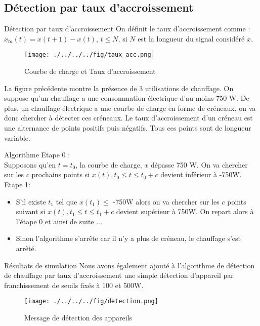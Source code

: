 \documentclass{beamer}
\begin{document}
\subsection{Détection par taux d'accroissement}

\begin{frame}{Détection par taux d'accroissement}
On définit le taux d'accroissement comme : $x_{ta}(t) = x(t+1) - x(t)$, $t \le N$, si $N$ est la longueur du signal considéré $x$.
\begin{figure}[!h]
\begin{center}
\texttt{[image: ./../../../fig/taux\_acc.png]}
\caption{Courbe de charge et Taux d'accroissement}
\label{Figure1}
\end{center}
\end{figure}
\end{frame}

\begin{frame}
La figure précédente montre la présence de 3 utilisations de chauffage. On suppose qu'un chauffage a une consommation électrique d'au moins 750 W. De plus, un chauffage électrique a une courbe de charge en forme de créneaux, on va donc chercher à détecter ces créneaux. Le taux d'accroissement d'un créneau est une alternance de points positifs puis négatifs. Tous ces points sont de longueur variable.
\end{frame}

\begin{frame}{Algorithme}
Etape 0 :\\
Supposons qu'en $t = t_0$, la courbe de charge, $x$ dépasse 750 W. On va chercher sur les $c$ prochains points si $x(t), t_0 \le t \le t_0 + c $ devient inférieur à -750W.\\
\vspace{0.5 cm}
Etape 1:\\
\begin{itemize}
	\item S'il existe $t_1$ tel que $x(t_1) \le$ -750W alors on va chercher sur les $c$ points suivant si $x(t), t_1 \le t \le t_1 + c $ devient supérieur à 750W. On repart alors à l'étape 0 et ainsi de suite ...
	\item Sinon l'algorithme s'arrête car il n'y a plus de créneau, le chauffage s'est arrêté.
\end{itemize}
\end{frame}

\begin{frame}{Résultats de simulation}
Nous avons également ajouté à l'algorithme de détection de chauffage par taux d'accroissement une simple détection d'appareil par franchissement de seuils fixés à 100 et 500W.
\begin{figure}[!h]
\begin{center}
\texttt{[image: ./../../../fig/detection.png]}
\caption{Message de détection des appareils}
\label{Figure2}
\end{center}
\end{figure}
\end{frame}
\end{document}
